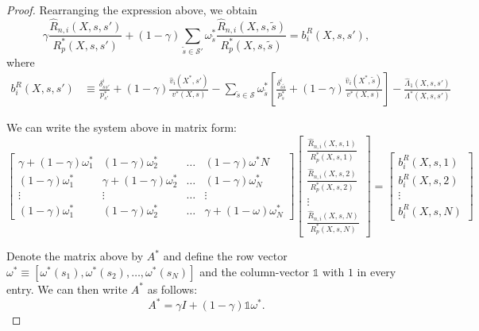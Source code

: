 \begin{proof}
Rearranging the expression above, we obtain
\begin{equation}
    \gamma \frac{\hat{R}_{n,i}(X,s,s')}{R^*_p(X,s,s')} +  (1-\gamma) \sum_{\tilde{s}\in\mathcal{S}'} \omega^*_{\tilde{s}} \frac{\hat{R}_{n,i}(X,s,\tilde{s})}{R^*_p(X,s,\tilde{s})} = b_i^R(X,s,s'),
\end{equation}
where
\begin{align}
    b_i^R(X,s,s') &\equiv \frac{\delta_{ss'}^i}{p_{s'}^*} + (1-\gamma)  \frac{\hat{v}_i(X^*,s')}{v^*(X,s)}- \sum_{\tilde{s}\in\mathcal{S}} \omega^*_{\tilde{s}} \left[ \frac{\delta_{s\tilde{s}}^i}{p_{\tilde{s}}^*} + (1-\gamma) \frac{\hat{v}_i(X^*,\tilde{s})}{v^*(X,s)}\right]-\frac{\hat{\Lambda}_1(X,s,s')}{\Lambda^*(X,s,s')} 
\end{align}

We can write the system above in matrix form:
\begin{equation}
    \left[
    \begin{matrix}
    \gamma + (1-\gamma) \omega^*_{1} & (1-\gamma) \omega^*_{2} & \ldots & (1-\gamma) \omega^*{N} \\
    (1-\gamma) \omega^*_{1} & \gamma + (1-\gamma) \omega^*_{2} & \ldots & (1-\gamma) \omega^*_{N} \\
    \vdots & \vdots & \ldots  & \vdots \\
    (1-\gamma) \omega^*_{1} &  (1-\gamma) \omega^*_2 & \ldots & \gamma + (1-\omega) \omega^*_{N}
    \end{matrix}
    \right] \left[ 
    \begin{matrix}
    \frac{\hat{R}_{n,i}(X,s,1)}{R^*_p(X,s,1)} \\
    \frac{\hat{R}_{n,i}(X,s,2)}{R^*_p(X,s,2)} \\
    \vdots\\
    \frac{\hat{R}_{n,i}(X,s,N)}{R^*_p(X,s,N)} 
    \end{matrix}
    \right] = 
    \left[ 
    \begin{matrix}
    b^R_i(X,s, 1) \\
    b^R_i(X,s, 2) \\
    \vdots\\
    b^R_i(X,s, N)
    \end{matrix}
    \right]
\end{equation}

Denote the matrix above by $A^*$ and define the row vector $\omega^* \equiv [\omega^*(s_1), \omega^*(s_2), \ldots, \omega^*(s_N)]$ and the column-vector $\mathbb{1}$ with $1$ in every entry. We can then write $A^*$ as follows:
\begin{equation}
    A^* = \gamma I + (1-\gamma) \mathbb{1} \omega^*. 
\end{equation}


\end{proof}
